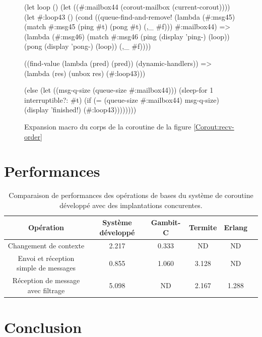 \documentclass[12pt,oneside,letterpaper,francais]{book}
\newcommand{\scheme}[1]{\selectlanguage{english}{\tt #1}\selectlanguage{french}}
\begin{document}
\begin{figure}[htb!]
  \begin{schemecode}
(let loop ()
  (let ((\#:mailbox44 (corout-mailbox (current-corout))))
    (let \#:loop43 ()
      (cond ((queue-find-and-remove!
              (lambda (\#:msg45)
                (match \#:msg45 (ping \#t) (pong \#t) (,\_ \#f)))
              \#:mailbox44)
             => (lambda (\#:msg46)
                  (match \#:msg46
                         (ping (display 'ping-) (loop))
                         (pong (display 'pong-) (loop))
                         (,\_ \#f))))
            
            ((find-value (lambda (pred) (pred)) (dynamic-handlers))
             => (lambda (res) (unbox res) (\#:loop43)))
            
            (else
             (let ((msg-q-size (queue-size \#:mailbox44)))
               (sleep-for 1 interruptible?: \#t)
               (if (= (queue-size \#:mailbox44) msg-q-size)
                   (display 'finished!)
                   (\#:loop43))))))))
  \end{schemecode}
  \caption{Expansion macro du corps de la coroutine \scheme{c1} de la
    figure \ref{Corout:recv-order}}
  \label{Corout:recv-exp}
\end{figure}

\section{Performances}
\label{Corout:bench-section}

\begin{table}
  \center
  \begin{tabular}{cccccc}
    \hline
    Opération & Système développé & Gambit-C & Termite & Erlang\\
    \hline \hline
    Changement de contexte                & 2.217 & 0.333 & ND    &    ND\\
    Envoi et réception simple de messages & 0.855 & 1.060 & 3.128 &    ND\\
    Réception de message avec filtrage    & 5.098 & ND    & 2.167 & 1.288\\
    \hline
  \end{tabular}
  \caption{Comparaison de performances des opérations de bases du
    système de coroutine développé avec des implantations
    concurentes.}
  \label{Corout:bench}
\end{table}


\section{Conclusion}
\end{document}
